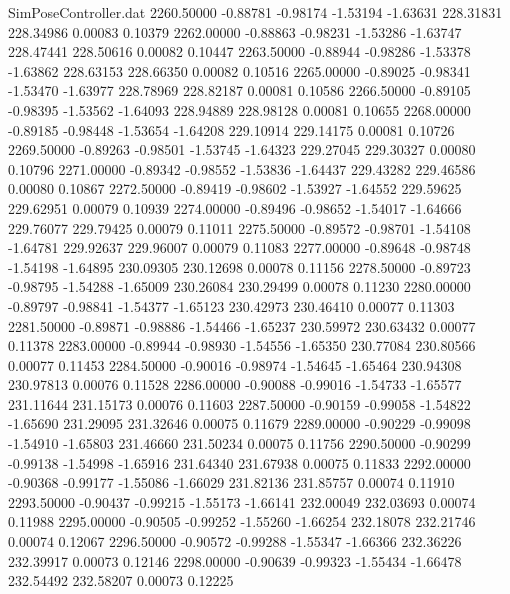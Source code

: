 \begin{filecontents}{SimPoseController.dat}
2260.50000   -0.88781   -0.98174    -1.53194   -1.63631  228.31831  228.34986    0.00083    0.10379
2262.00000   -0.88863   -0.98231    -1.53286   -1.63747  228.47441  228.50616    0.00082    0.10447
2263.50000   -0.88944   -0.98286    -1.53378   -1.63862  228.63153  228.66350    0.00082    0.10516
2265.00000   -0.89025   -0.98341    -1.53470   -1.63977  228.78969  228.82187    0.00081    0.10586
2266.50000   -0.89105   -0.98395    -1.53562   -1.64093  228.94889  228.98128    0.00081    0.10655
2268.00000   -0.89185   -0.98448    -1.53654   -1.64208  229.10914  229.14175    0.00081    0.10726
2269.50000   -0.89263   -0.98501    -1.53745   -1.64323  229.27045  229.30327    0.00080    0.10796
2271.00000   -0.89342   -0.98552    -1.53836   -1.64437  229.43282  229.46586    0.00080    0.10867
2272.50000   -0.89419   -0.98602    -1.53927   -1.64552  229.59625  229.62951    0.00079    0.10939
2274.00000   -0.89496   -0.98652    -1.54017   -1.64666  229.76077  229.79425    0.00079    0.11011
2275.50000   -0.89572   -0.98701    -1.54108   -1.64781  229.92637  229.96007    0.00079    0.11083
2277.00000   -0.89648   -0.98748    -1.54198   -1.64895  230.09305  230.12698    0.00078    0.11156
2278.50000   -0.89723   -0.98795    -1.54288   -1.65009  230.26084  230.29499    0.00078    0.11230
2280.00000   -0.89797   -0.98841    -1.54377   -1.65123  230.42973  230.46410    0.00077    0.11303
2281.50000   -0.89871   -0.98886    -1.54466   -1.65237  230.59972  230.63432    0.00077    0.11378
2283.00000   -0.89944   -0.98930    -1.54556   -1.65350  230.77084  230.80566    0.00077    0.11453
2284.50000   -0.90016   -0.98974    -1.54645   -1.65464  230.94308  230.97813    0.00076    0.11528
2286.00000   -0.90088   -0.99016    -1.54733   -1.65577  231.11644  231.15173    0.00076    0.11603
2287.50000   -0.90159   -0.99058    -1.54822   -1.65690  231.29095  231.32646    0.00075    0.11679
2289.00000   -0.90229   -0.99098    -1.54910   -1.65803  231.46660  231.50234    0.00075    0.11756
2290.50000   -0.90299   -0.99138    -1.54998   -1.65916  231.64340  231.67938    0.00075    0.11833
2292.00000   -0.90368   -0.99177    -1.55086   -1.66029  231.82136  231.85757    0.00074    0.11910
2293.50000   -0.90437   -0.99215    -1.55173   -1.66141  232.00049  232.03693    0.00074    0.11988
2295.00000   -0.90505   -0.99252    -1.55260   -1.66254  232.18078  232.21746    0.00074    0.12067
2296.50000   -0.90572   -0.99288    -1.55347   -1.66366  232.36226  232.39917    0.00073    0.12146
2298.00000   -0.90639   -0.99323    -1.55434   -1.66478  232.54492  232.58207    0.00073    0.12225

\end{filecontents}
